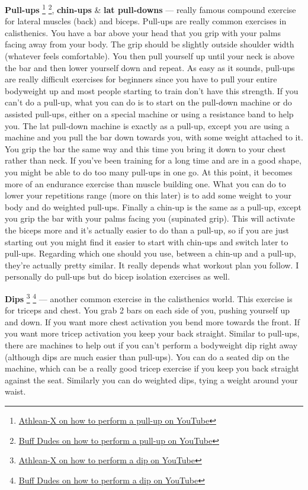 \documentclass[openany, 12pt]{book}
\begin{document}
        \textbf{Pull-ups}
        \footnote{\href{https://www.youtube.com/watch?v=sIvJTfGxdFo}{Athlean-X on how to perform a pull-up on YouTube}}
        \footnote{\href{https://www.youtube.com/watch?v=vw5Xmu5CIew}{Buff Dudes on how to perform a pull-up on YouTube}},
        \textbf{chin-ups} \& \textbf{lat pull-downs}
        --- really famous compound exercise for lateral muscles (back) and biceps. Pull-ups are really common exercises in calisthenics. You have a bar above your head that you grip with your palms facing
        away from your body. The grip should be slightly outside shoulder width (whatever feels comfortable). You then pull yourself up until your neck is above the bar and then lower yourself down and
        repeat. As easy as it sounds, pull-ups are really difficult exercises for beginners since you have to pull your entire bodyweight up and most people starting to train don't have this strength.
        If you can't do a pull-up, what you can do is to start on the pull-down machine or do assisted pull-ups, either on a special machine or using
        a resistance band to help you. The lat pull-down machine is exactly as a pull-up, except you are using a machine and you pull the bar down towards you, with some weight attached to it.
        You grip the bar the same way and this time you bring it down to your chest rather than neck.
        If you've been training for a long time and are in a good shape, you might be able to do too many pull-ups in one go. At this point, it
        becomes more of an endurance exercise than muscle building one. What you can do to lower your repetitions range (more on this later) is to add some weight to your body and do weighted
        pull-ups. Finally a chin-up is the same as a pull-up, except you grip the bar with your palms facing you (supinated grip). This will activate the biceps more and it's actually easier to
        do than a pull-up, so if you are just starting out you might find it easier to start with chin-ups and switch later to pull-ups. Regarding which one should you use, between a chin-up and
        a pull-up, they're actually pretty similar. It really depends what workout plan you follow. I personally do pull-ups but do bicep isolation exercises as well.

        \textbf{Dips}
        \footnote{\href{https://www.youtube.com/watch?v=vi1-BOcj3cQ}{Athlean-X on how to perform a dip on YouTube}}
        \footnote{\href{https://www.youtube.com/watch?v=wjUmnZH528Y}{Buff Dudes on how to perform a dip on YouTube}}
        --- another common exercise in the calisthenics world. This exercise is for triceps and chest. You grab 2 bars on each side of you, pushing yourself up and down.
        If you want more chest activation you bend more towards the front. If you want more tricep activation you keep your back straight. Similar to pull-ups, there are machines to
        help out if you can't perform a bodyweight dip right away (although dips are much easier than pull-ups). You can do a seated dip on the machine, which can be a really good
        tricep exercise if you keep you back straight against the seat. Similarly you can do weighted dips, tying a weight around your waist.
\end{document}
